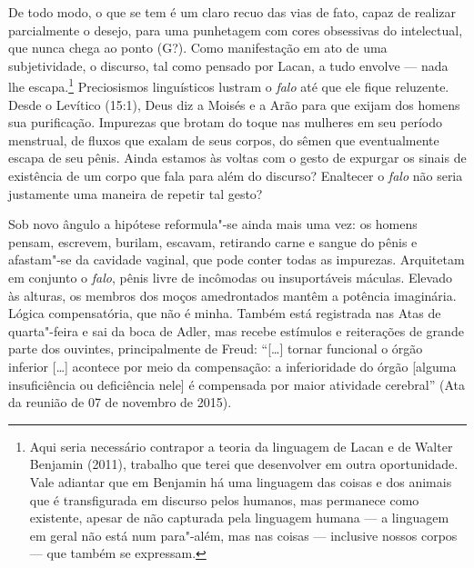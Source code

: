De todo modo, o que se tem é um claro recuo das vias de fato, capaz de
realizar parcialmente o desejo, para uma punhetagem com cores obsessivas
do intelectual, que nunca chega ao ponto (G?). Como manifestação em ato
de uma subjetividade, o discurso, tal como pensado por Lacan, a tudo
envolve --- nada lhe escapa.\footnote{Aqui seria necessário contrapor a
  teoria da linguagem de Lacan e de Walter Benjamin (2011),
  trabalho que terei que desenvolver em outra oportunidade. Vale
  adiantar que em Benjamin há uma linguagem das coisas e dos animais que
  é transfigurada em discurso pelos humanos, mas permanece como
  existente, apesar de não capturada pela linguagem humana --- a
  linguagem em geral não está num para"-além, mas nas coisas --- inclusive
  nossos corpos --- que também se expressam.} Preciosismos linguísticos
lustram o \emph{falo} até que ele fique reluzente. Desde o Levítico
(15:1), Deus diz a Moisés e a Arão para que exijam dos homens sua
purificação. Impurezas que brotam do toque nas mulheres em seu período
menstrual, de fluxos que exalam de seus corpos, do sêmen que
eventualmente escapa de seu pênis. Ainda estamos às voltas com o gesto
de expurgar os sinais de existência de um corpo que fala para além do
discurso? Enaltecer o \emph{falo} não seria justamente uma maneira de
repetir tal gesto?

Sob novo ângulo a hipótese reformula"-se ainda mais uma vez: os homens
pensam, escrevem, burilam, escavam, retirando carne e sangue do pênis e
afastam"-se da cavidade vaginal, que pode conter todas as impurezas.
Arquitetam em conjunto o \emph{falo}, pênis livre de incômodas ou
insuportáveis máculas. Elevado às alturas, os membros dos moços
amedrontados mantêm a potência imaginária. Lógica compensatória, que não
é minha. Também está registrada nas Atas de quarta"-feira e sai da boca
de Adler, mas recebe estímulos e reiterações de grande parte dos
ouvintes, principalmente de Freud: ``{[}\ldots{}{]} tornar funcional o órgão
inferior {[}\ldots{}{]} acontece por meio da compensação: a inferioridade do
órgão {[}alguma insuficiência ou deficiência nele{]} é compensada por
maior atividade cerebral'' (Ata da reunião de 07 de novembro de 2015).

